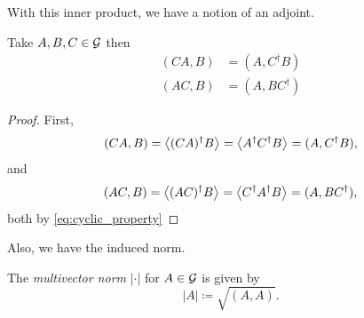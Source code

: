 With this inner product, we have a notion of an adjoint.
\begin{proposition}
\label{prop:adjoint}
Take $A,B,C \in \mathcal{G}$ then
\begin{align}
(CA,B) &= (A,C^\dagger B)\\
(AC,B) &= (A,BC^\dagger)
\end{align}
\end{proposition}
\begin{proof}
First,
\begin{align}
(CA,B) = \left\langle(CA)^\dagger B\right\rangle_{} = \left\langle A^\dagger C^\dagger B \right\rangle_{} = (A,C^\dagger B),
\end{align}
and
\begin{align}
(AC,B) = \left\langle(AC)^\dagger B\right\rangle_{} = \left\langle C^\dagger A^\dagger B \right\rangle_{} = (A,BC^\dagger),
\end{align}
both by \cref{eq:cyclic_property}
\end{proof}
Also, we have the induced norm.
\begin{definition}
    The \emph{multivector norm} $| \cdot |$ for $A \in \mathcal{G}$ is given by
    \begin{equation}
    |A| \coloneqq \sqrt{(A,A)}.
    \end{equation}
\end{definition}

